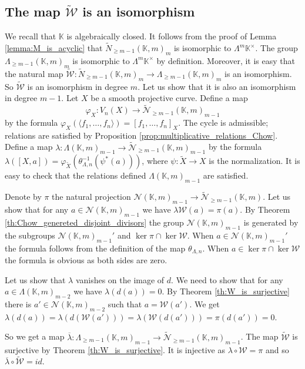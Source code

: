\documentclass[12pt]{extarticle}
\def\mb{\mathbb}
\def\mc{\mathcal}
\def\L{\Lambda}
\def\k{\mb K}
\def\ph{\varphi}
\def\cl{\colon}
\def\wt{\widetilde}
\def\W{\mc W}
\def \tW{\wt{\W}}
\def \wW{\tW}
\def \wL{\L_{\geq m-1}}
\def \CH{\mc{N}}
\def \wCH{\wt{\CH}_{\geq m-1}}
\begin{document}
\subsection{The map $\wt{\mc W}$ is an isomorphism}
We recall that $\k$ is algebraically closed. It follows from the proof of Lemma \ref{lemma:M_is_acyclic} that $\wt N_{\geq m-1}(\k,m)_m$ is isomorphic to $\Lambda^m\k^\times$. The group $\L_{\geq m-1}(\k,m)_m$ is isomorphic to $\Lambda^m\k^\times$ by definition. Moreover, it is easy that the natural map $\wt{\mc W}\colon\wt N_{\geq m-1}(\k,m)_m\to \L_{\geq m-1}(\k,m)_m$ is an isomorphism. So $\wt{\mc W}$ is an isomorphism in degree $m$.
Let us show that it is also an isomorphism in degree $m-1$.
Let $X$ be a smooth projective curve. Define a map 
$$\ph_X\colon V_n(X)\to \wCH(\k,m)_{m-1}$$
by the formula
    $\ph_X(\langle f_1,\dots, f_n\rangle)=[f_1,\dots, f_n]_X$. The cycle is admissible; relations are satisfied by Proposition \ref{prop:multiplicative_relations_Chow}. 
     Define a map $\lambda\cl \L(\k,m)_{m-1}\to \wCH(\k,m)_{m-1}$
by the formula $\lambda([X, a])=\ph_{\wt X}(\theta_{\Lambda, n}^{-1}(\psi^*(a)))$, where $\psi\colon \wt X\to X$ is the normalization. It is easy to check that the relations defined $\L(\k,m)_{m-1}$ are satisfied. 

Denote by $\pi$ the natural projection $\CH(\k,m)_{m-1}\to \wCH(\k,m)$. Let us show that for any $a\in \CH(\k,m)_{m-1}$ we have $\lambda\W(a)=\pi(a)$. By Theorem \ref{th:Chow_genereted_disjoint_divisors} the group $\CH(\k,m)_{m-1}$ is generated by the subgroups $\CH(\k,m)_{m-1}'$ and $\ker\pi\cap\ker\W$. When $a\in \CH(\k,m)_{m-1}'$ the formula follows from the definition of the map $\theta_{\Lambda,n}$. When $a\in \ker\pi\cap\ker\W$ the formula is obvious as both sides are zero.

Let us show that $\lambda$ vanishes on the image of $d$. We need to show that for any $a\in \L(\k,m)_{m-2}$ we have $\lambda(d(a))=0$. By Theorem \ref{th:W_is_surjective} there is $a'\in \CH(\k,m)_{m-2}$ such that $a=\mc W(a')$. We get $\lambda(d(a))=\lambda(d(\mc W(a')))=\lambda(\mc W(d(a')))=\pi(d(a'))=0$.

So we get a map $\overline{\lambda}\colon \wL(\k,m)_{m-1}\to \wCH(\k,m)_{m-1}$. The map $\wW$ is surjective by Theorem \ref{th:W_is_surjective}. It is injective as $\lambda\circ\W=\pi$ and so $\overline{\lambda}\circ\wW=id$.
\end{document}
